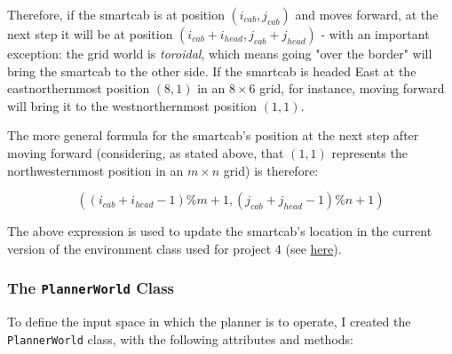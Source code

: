 \documentclass{article}
\begin{document}
Therefore, if the smartcab is at position $(i_{cab}, j_{cab})$ and moves forward, at the next step it will be at position $(i_{cab} + i_{head}, j_{cab} + j_{head})$ - with an important exception: the grid world is \textit{toroidal}, which means going "over the border" will bring the smartcab to the other side. If the smartcab is headed East at the eastnorthernmost position $(8, 1)$ in an $8\times6$ grid, for instance, moving forward will bring it to the westnorthernmost position $(1, 1)$. 

The more general formula for the smartcab's position at the next step after moving forward (considering, as stated above, that $(1, 1)$ represents the northwesternmost position in an $m\times n$ grid) is therefore:

\begin{equation}
((i_{cab} + i_{head} - 1) \% m + 1, (j_{cab} + j_{head} - 1) \% n + 1)
\end{equation}

The above expression is used to update the smartcab's location in the current version of the environment class used for project 4 (see \href{https://github.com/udacity/machine-learning/blob/2b6a7fca8ea43e00519f426a6b4ad3a130fca737/projects/smartcab/smartcab/environment.py#L195-L19}{here}).

\subsubsection{The \texttt{PlannerWorld} Class}
\label{sec:plannerworld}

To define the input space in which the planner is to operate, I created the \texttt{PlannerWorld} class, with the following attributes and methods:
\end{document}
